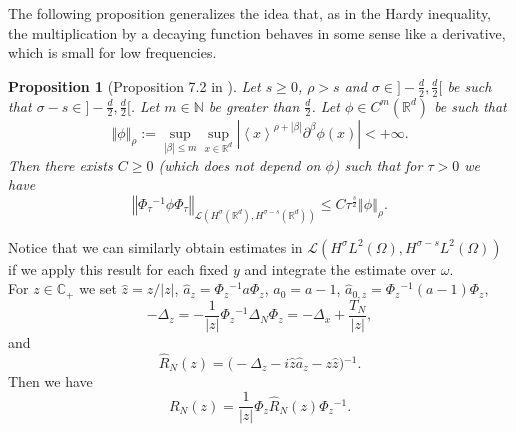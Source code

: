 \documentclass[10pt, a4paper,reqno]{amsart}
\theoremstyle{plain}
\newtheorem{proposition}[theorem]{Proposition}
\theoremstyle{definition}
\theoremstyle{remark}
\begin{document}
The following proposition generalizes the idea that, as in the Hardy inequality, the multiplication by a decaying function behaves in some sense like a derivative, which is small for low frequencies.

\begin{proposition}[Proposition 7.2 in \cite{boucletr14}] \label{prop-dec-sob}
Let $s {\geqslant} 0$, $\rho > s$ and ${\sigma} \in \big] -\frac d 2, \frac d 2\big[$ be such that ${\sigma} -s \in \big] -\frac d 2, \frac d 2\big[$. Let $m \in {\mathbb{N}}$ be greater than $\frac d 2$. Let ${\phi} \in C^m({\mathbb{R}}^d)$ be such that 
\[
{\left\Vert {\phi}\right\Vert}_\rho := \sup_{{\left\vert {\beta}\right\vert} {\leqslant} m} \sup_{x \in {\mathbb{R}}^d} {\left\vert {{\left< x \right>}^{\rho + {\left\vert {\beta}\right\vert}} \partial^{\beta} {\phi}(x)}\right\vert} < + \infty.
\]
Then there exists $C {\geqslant} 0$ (which does not depend on ${\phi}$) such that for ${\tau} > 0$ we have
\[
 {\left\Vert {\Phi_{\tau} {^{-1}} {\phi} \Phi_{\tau}}\right\Vert}_{{{\mathcal L}}(H^{\sigma}({\mathbb{R}}^d),H^{{\sigma}-s}({\mathbb{R}}^d))} {\leqslant} C {\tau}^{\frac s 2} {\left\Vert {\phi}\right\Vert}_{\rho}.
\]
\end{proposition}

Notice that we can similarly obtain estimates in ${{\mathcal L}}(H^{\sigma} L^2({\Omega}),H^{{\sigma}-s}L^2({\Omega}))$ if we apply this result for each fixed $y$ and integrate the estimate over ${\omega}$.\\

For $z \in {\mathbb{C}}_+$ we set $\hat z = z / {\left\vert z\right\vert}$, $\hat a_{z} =\Phi_z{^{-1}} a \Phi_z$, $a_0 = a-1$, $\hat a_{0,z} = \Phi_z{^{-1}} (a-1) \Phi_z$,
\[
-{{\Delta}_z} = - \frac 1 {{\left\vert z\right\vert}} \Phi_z{^{-1}} {{\Delta}_N}  \Phi_z =  -{{\Delta}_x} + \frac {T_N}{{\left\vert z\right\vert}},
\]
and 
\[
{\hat R_N(z)} = \big( -{{\Delta}_z} - i \hat z \hat a_{z} - z \hat z \big){^{-1}}.
\]
Then we have 
\[
{R_N(z)} = \frac 1 {{\left\vert z\right\vert}} \Phi_z {\hat R_N(z)} \Phi_z {^{-1}}.
\]
\end{document}
